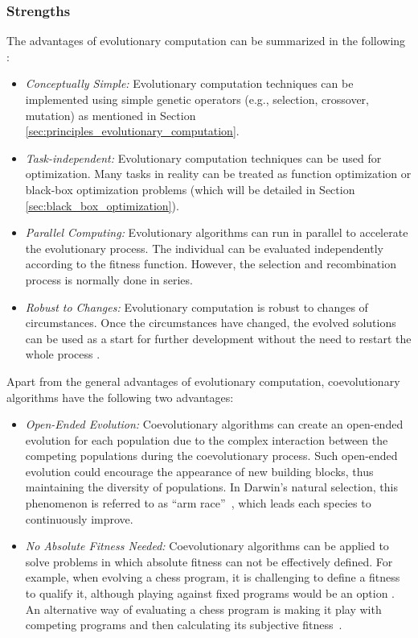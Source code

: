 \subsubsection{Strengths}

The advantages of evolutionary computation can be summarized in the following \cite{Fogel:1997}:

\begin{itemize}
\item \textit{Conceptually Simple:} Evolutionary computation techniques can be implemented using simple genetic operators (e.g., selection, crossover, mutation) as mentioned in Section \ref{sec:principles_evolutionary_computation}. 

\item \textit{Task-independent:} Evolutionary computation techniques can be used for optimization. Many tasks in reality can be treated as function optimization or black-box optimization problems (which will be detailed in Section \ref{sec:black_box_optimization}). 

\item \textit{Parallel Computing:} Evolutionary algorithms can run in parallel to accelerate the evolutionary process. The individual can be evaluated independently according to the fitness function. However, the selection and recombination process is normally done in series.

\item \textit{Robust to Changes:} Evolutionary computation is robust to changes of circumstances. Once the circumstances have changed, the evolved solutions can be used as a start for further development without the need to restart the whole process \cite{Hornby2011}.
 
\end{itemize}

Apart from the general advantages of evolutionary computation, coevolutionary algorithms have the following two advantages:

\begin{itemize}
\item \textit{Open-Ended Evolution:} Coevolutionary algorithms can create an open-ended evolution for each population due to the complex interaction between the competing populations during the coevolutionary process. Such open-ended evolution could encourage the appearance of new building blocks, thus maintaining the diversity of populations. In Darwin's natural selection, this phenomenon is referred to as ``arm race''~\cite{Dawkins_1979}, which leads each species to continuously improve.  

\item \textit{No Absolute Fitness Needed:} Coevolutionary algorithms can be applied to solve problems in which absolute fitness can not be effectively defined. For example, when evolving a chess program, it is challenging to define a fitness to qualify it, although playing against fixed programs would be an option \cite{gross2002evolving}. An alternative way of evaluating a chess program is making it play with competing programs and then calculating its subjective fitness~\cite{Angeline_1993, David2014}. 
\end{itemize}

